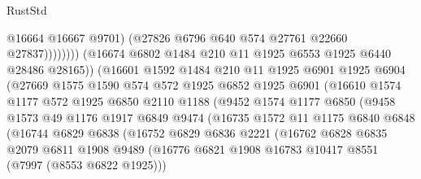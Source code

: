 \begin{lexlean}{RustStd}
\begin{coremodule}
{\begin{coremodule}
{{{{{{{{{{{{{{{{{{{{{{{{{{{{{{{{{{{{{{{{{{{                                      @16664
                                      @16667
                                      @9701)
                                    (@27826 @6796 @640 @574 @27761 @22660 @27837))))))))
                      (@16674 @6802 @1484 @210 @11 @1925 @6553 @1925 @6440 @28486 @28165))
                    (@16601
                      @1592
                      @1484
                      @210
                      @11
                      @1925
                      @6901
                      @1925
                      @6904
                      (@27669
                        @1575
                        @1590
                        @574
                        @572
                        @1925
                        @6852
                        @1925
                        @6901
                        (@16610
                          @1574
                          @1177
                          @572
                          @1925
                          @6850
                          @2110
                          @1188
                          (@9452
                            @1574
                            @1177
                            @6850
                            (@9458
                              @1573
                              @49
                              @1176
                              @1917
                              @6849
                              @9474
                              (@16735
                                @1572
                                @11
                                @1175
                                @6840
                                @6848
                                (@16744
                                  @6829
                                  @6838
                                  (@16752
                                    @6829
                                    @6836
                                    @2221
                                    (@16762
                                      @6828
                                      @6835
                                      @2079
                                      @6811
                                      @1908
                                      @9489
                                      (@16776
                                        @6821
                                        @1908
                                        @16783
                                        @10417
                                        @8551
                                        (@7997 (@8553 @6822 @1925)))
}}}}}}}}}}}}}}}}}}}}}}}}}}}}}}}}}}}}}}}}}}}
\end{coremodule}}
\end{coremodule}
\end{lexlean}
